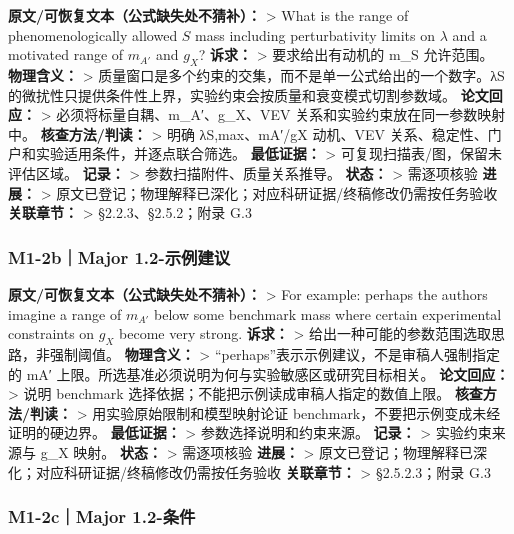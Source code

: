 \documentclass[
]{article}
\begin{document}
\textbf{原文/可恢复文本（公式缺失处不猜补）：} \textgreater{} What is
the range of phenomenologically allowed \(S\) mass including
perturbativity limits on \(\lambda\) and a motivated range of \(m_{A'}\)
and \(g_X\)? \textbf{诉求：} \textgreater{} 要求给出有动机的 m\_S
允许范围。 \textbf{物理含义：} \textgreater{}
质量窗口是多个约束的交集，而不是单一公式给出的一个数字。λS
的微扰性只提供条件性上界，实验约束会按质量和衰变模式切割参数域。
\textbf{论文回应：} \textgreater{} 必须将标量自耦、m\_A′、g\_X、VEV
关系和实验约束放在同一参数映射中。 \textbf{核查方法/判读：}
\textgreater{} 明确 λS,max、mA′/gX 动机、VEV
关系、稳定性、门户和实验适用条件，并逐点联合筛选。 \textbf{最低证据：}
\textgreater{} 可复现扫描表/图，保留未评估区域。 \textbf{记录：}
\textgreater{} 参数扫描附件、质量关系推导。 \textbf{状态：}
\textgreater{} 需逐项核验 \textbf{进展：} \textgreater{}
原文已登记；物理解释已深化；对应科研证据/终稿修改仍需按任务验收
\textbf{关联章节：} \textgreater{} §2.2.3、§2.5.2；附录 G.3

\subsubsection{M1-2b｜Major
1.2-示例建议}\label{m1-2bmajor-1.2-ux793aux4f8bux5efaux8bae}

\textbf{原文/可恢复文本（公式缺失处不猜补）：} \textgreater{} For
example: perhaps the authors imagine a range of \(m_{A'}\) below some
benchmark mass where certain experimental constraints on \(g_X\) become
very strong. \textbf{诉求：} \textgreater{}
给出一种可能的参数范围选取思路，非强制阈值。 \textbf{物理含义：}
\textgreater{} ``perhaps''表示示例建议，不是审稿人强制指定的 mA′
上限。所选基准必须说明为何与实验敏感区或研究目标相关。
\textbf{论文回应：} \textgreater{} 说明 benchmark
选择依据；不能把示例读成审稿人指定的数值上限。 \textbf{核查方法/判读：}
\textgreater{} 用实验原始限制和模型映射论证
benchmark，不要把示例变成未经证明的硬边界。 \textbf{最低证据：}
\textgreater{} 参数选择说明和约束来源。 \textbf{记录：} \textgreater{}
实验约束来源与 g\_X 映射。 \textbf{状态：} \textgreater{} 需逐项核验
\textbf{进展：} \textgreater{}
原文已登记；物理解释已深化；对应科研证据/终稿修改仍需按任务验收
\textbf{关联章节：} \textgreater{} §2.5.2.3；附录 G.3

\subsubsection{M1-2c｜Major 1.2-条件}\label{m1-2cmajor-1.2-ux6761ux4ef6}
\end{document}
